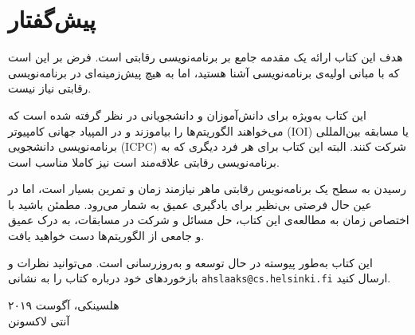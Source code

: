 \chapter*{پیش‌گفتار}

هدف این کتاب ارائه یک مقدمه جامع بر برنامه‌نویسی رقابتی است.
فرض بر این است که با مبانی اولیه‌ی برنامه‌نویسی آشنا هستید،
اما به هیچ پیش‌زمینه‌ای در برنامه‌نویسی رقابتی نیاز نیست.

این کتاب به‌ویژه برای دانش‌آموزان و دانشجویانی در نظر گرفته شده است که می‌خواهند
الگوریتم‌ها را بیاموزند و در المپیاد جهانی کامپیوتر (IOI) یا
مسابقه بین‌المللی برنامه‌نویسی دانشجویی (ICPC) شرکت کنند.
البته این کتاب برای هر فرد دیگری که به برنامه‌نویسی رقابتی علاقه‌مند است نیز کاملا مناسب است.

رسیدن به سطح یک برنامه‌نویس رقابتی ماهر نیازمند زمان و تمرین بسیار است،
اما در عین حال فرصتی بی‌نظیر برای یادگیری عمیق به شمار می‌رود.
مطمئن باشید با اختصاص زمان به مطالعه‌ی این کتاب،
حل مسائل و شرکت در مسابقات، به درک عمیق و جامعی از الگوریتم‌ها دست خواهید یافت.

این کتاب به‌طور پیوسته در حال توسعه و به‌روزرسانی است.
می‌توانید نظرات و بازخوردهای خود درباره کتاب را به نشانی
\texttt{ahslaaks@cs.helsinki.fi}
ارسال کنید.

\begin{flushright}
هلسینکی، آگوست ۲۰۱۹ \\
آنتی لاکسونن
\end{flushright}
